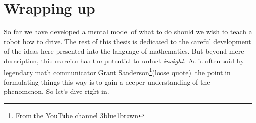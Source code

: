 \section{Wrapping up}
So far we have developed a mental model of what to do should we wish 
to teach a robot how to drive. The rest of this thesis is dedicated to 
the careful development of the ideas here presented into the language 
of mathematics. But beyond mere description, this exercise has the 
potential to unlock \textit{insight}. As is often said by legendary 
math communicator Grant Sanderson\footnote{From the YouTube channel 
\href{https://www.youtube.com/channel/UCYO_jab_esuFRV4b17AJtAw}{3blue1brown}}(loose 
quote), the point in formulating things this way is to gain a deeper 
understanding of the phenomenon. So let's dive right in.
